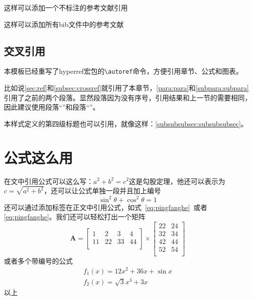 \documentclass[supercite]{HustGraduTrans}
\begin{document}
    这样可以添加一个不标注的参考文献引用\nocite{9787508342894}
    
    这样可以添加所有bib文件中的参考文献\nocite{*}
    
    \subsection{交叉引用}\label{subsec:crossref}
    本模板已经重写了hyperref宏包的\verb|\autoref|命令，方便引用章节、公式和图表。
    
    比如说\autoref{sec:ref}和\autoref{subsec:crossref}就引用了本章节，\autoref{para:para}和\autoref{subpara:subpara}引用了之前的两个段落。显然段落因为没有序号，引用结果和上一节的需要相同，因此建议使用段落“”和段落“”。
    
    本样式定义的第四级标题也可以引用，就像这样：\autoref{subsubsubsec:subsubsubsec}。
    
    
    
    \section{公式这么用}
    在文中引用公式可以这么写：$a^2+b^2=c^2$这是勾股定理，他还可以表示为$c=\sqrt{a^2+b^2}$，还可以让公式单独一段并且加上编号
    \begin{equation}
    \sin^2{\theta}+\cos^2{\theta}=1 \label{eq:pingfanghe}
    \end{equation}
    还可以通过添加标签在正文中引用公式，如式~\eqref{eq:pingfanghe}~或者\autoref{eq:pingfanghe}。我们还可以轻松打出一个矩阵
    \begin{equation}
    \bm{A}=\begin{bmatrix}
    1&2&3&4\\
    11&22&33&44\\
    \end{bmatrix}
    \times\begin{bmatrix}
    22&24\\
    32&34\\
    42&44\\
    52&54\\
    \end{bmatrix}
    \end{equation}
    或者多个带编号的公式
    \begin{eqnarray}
    f_1(x)=12x^2+36x+\sin x\\
    f_2(x)=\sqrt{3}{x^3+3x}
    \end{eqnarray}
    以上
    
\end{document}
